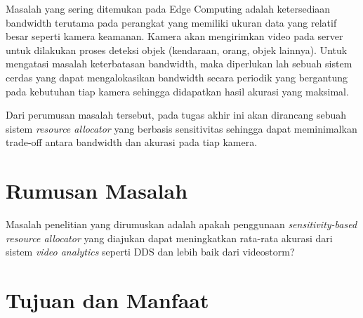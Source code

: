Masalah yang sering ditemukan pada Edge Computing adalah ketersediaan bandwidth terutama pada perangkat yang memiliki ukuran data yang relatif besar seperti
kamera keamanan. Kamera akan mengirimkan video pada server untuk dilakukan proses deteksi objek (kendaraan, orang, objek lainnya). Untuk mengatasi
masalah keterbatasan bandwidth, maka diperlukan lah sebuah sistem cerdas yang dapat mengalokasikan bandwidth secara periodik yang bergantung pada kebutuhan tiap kamera sehingga
didapatkan hasil akurasi yang maksimal.

Dari perumusan masalah tersebut, pada tugas akhir ini akan dirancang sebuah sistem \textit{resource allocator} yang berbasis
sensitivitas sehingga dapat meminimalkan trade-off antara bandwidth dan akurasi pada tiap kamera. 


\section{Rumusan Masalah}




Masalah penelitian yang dirumuskan adalah apakah penggunaan \textit{sensitivity-based resource allocator} yang diajukan dapat meningkatkan 
rata-rata akurasi dari sistem \textit{video analytics} seperti DDS dan lebih baik dari videostorm?
\section{Tujuan dan Manfaat}

